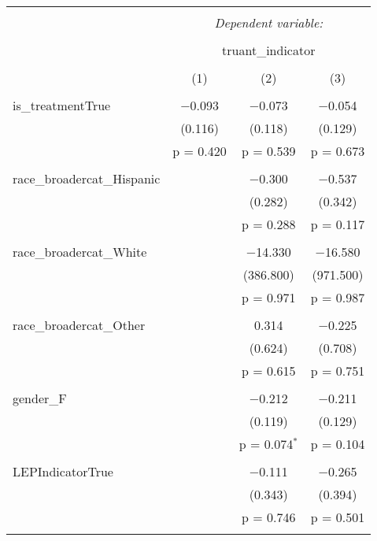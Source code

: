 
\begin{table}[!htbp] \centering 
  \caption{} 
  \label{} 
\begin{tabular}{@{\extracolsep{5pt}}lccc} 
\\[-1.8ex]\hline 
\hline \\[-1.8ex] 
 & \multicolumn{3}{c}{\textit{Dependent variable:}} \\ 
\cline{2-4} 
\\[-1.8ex] & \multicolumn{3}{c}{truant\_indicator} \\ 
\\[-1.8ex] & (1) & (2) & (3)\\ 
\hline \\[-1.8ex] 
 is\_treatmentTrue & $-$0.093 & $-$0.073 & $-$0.054 \\ 
  & (0.116) & (0.118) & (0.129) \\ 
  & p = 0.420 & p = 0.539 & p = 0.673 \\ 
  & & & \\ 
 race\_broadercat\_Hispanic &  & $-$0.300 & $-$0.537 \\ 
  &  & (0.282) & (0.342) \\ 
  &  & p = 0.288 & p = 0.117 \\ 
  & & & \\ 
 race\_broadercat\_White &  & $-$14.330 & $-$16.580 \\ 
  &  & (386.800) & (971.500) \\ 
  &  & p = 0.971 & p = 0.987 \\ 
  & & & \\ 
 race\_broadercat\_Other &  & 0.314 & $-$0.225 \\ 
  &  & (0.624) & (0.708) \\ 
  &  & p = 0.615 & p = 0.751 \\ 
  & & & \\ 
 gender\_F &  & $-$0.212 & $-$0.211 \\ 
  &  & (0.119) & (0.129) \\ 
  &  & p = 0.074$^{*}$ & p = 0.104 \\ 
  & & & \\ 
 LEPIndicatorTrue &  & $-$0.111 & $-$0.265 \\ 
  &  & (0.343) & (0.394) \\ 
  &  & p = 0.746 & p = 0.501 \\ 
  & & & \\ 

\end{tabular}
\end{table}

